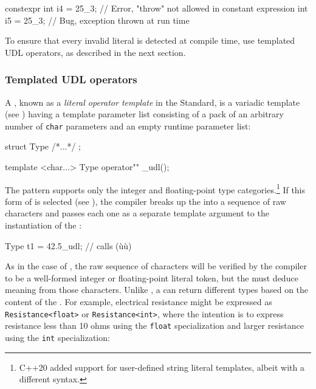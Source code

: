 \begin{emcppslisting}[emcppsbatch=e11]
constexpr int i4 = 25_3;  // Error, "throw" not allowed in constant expression
          int i5 = 25_3;  // Bug, exception thrown at run time
\end{emcppslisting}

\noindent To ensure that every invalid literal is detected at compile time, use
templated UDL operators, as described in the next section.

\subsubsection[Templated UDL operators]{Templated UDL operators}\label{templated-udl-operators}

A , known as a \emph{literal operator
template} in the Standard, is a variadic template (see ) having a template parameter list
consisting of a pack of an arbitrary number of \lstinline!char! parameters
and an empty runtime parameter list:

\begin{emcppslisting}[emcppsbatch=e12]
struct Type { /*...*/ };

template <char...> Type operator"" _udl();
\end{emcppslisting}

\noindent The  pattern supports only the integer
and floating-point type categories.{\cprotect\footnote{C++20 added
support for user-defined string literal templates, albeit with a
  different syntax.}} If this form of  is selected
(see ), the compiler breaks up the
 into a sequence of raw characters and passes each
one as a separate template argument to the instantiation of the
:

\begin{emcppslisting}[emcppsbatch=e12]
Type t1 = 42.5_udl;  // calls (ù{}ù)
\end{emcppslisting}

\noindent As in the case of , the raw sequence of
characters will be verified by the compiler to be a well-formed integer
or floating-point literal token, but the  must
deduce meaning from those characters. Unlike ,
a  can return different types based on
the content of the . For example, electrical
resistance might be expressed as \lstinline!Resistance<float>! or
\lstinline!Resistance<int>!, where the intention is to express resistance
less than 10 ohms using the \lstinline!float! specialization and larger
resistance using the \lstinline!int! specialization:

